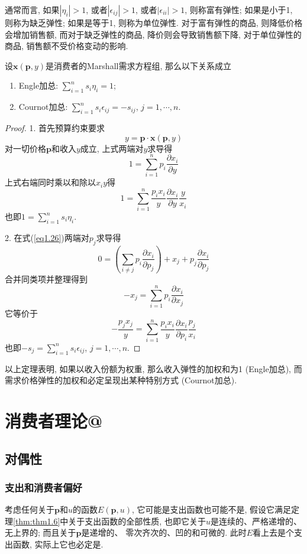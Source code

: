 \documentclass[cn, 12pt, math=mtpro2, bibstyle=apa, blue]{elegantbook}
\makeatletter
\newcommand*{\rom}[1]{\expandafter\@slowromancap\romannumeral #1@}
\newcommand{\p}{\mathbf{p}}
\newcommand{\x}{\mathbf{x}}
\makeatother
\begin{document}
通常而言, 如果$|\eta_i|>1$, 或者$|\epsilon_{ij}|>1$, 或者$|\epsilon_{ii}|>1$, 则称富有弹性; 如果是小于1, 则称为缺乏弹性; 如果是等于1, 则称为单位弹性. 对于富有弹性的商品, 则降低价格会增加销售额, 而对于缺乏弹性的商品, 降价则会导致销售额下降, 对于单位弹性的商品, 销售额不受价格变动的影响.
\begin{theorem}\label{thm:thm1.8}
  设$\x(\p,y)$是消费者的Marshall需求方程组, 那么以下关系成立
  \begin{enumerate}[label=\arabic*.]
    \item Engle加总: $\sum_{i=1}^{n}s_i\eta_i=1$;
    \item Cournot加总: $\sum_{i=1}^{n}s_i\epsilon_{ij}=-s_{ij}$, $j=1,\cdots,n$.
  \end{enumerate}
\end{theorem}
\begin{proof}
  1. 首先预算约束要求
  \begin{equation}\label{eq1.26}
    y=\p\cdot\x(\p,y)
  \end{equation}
  对一切价格$\p$和收入$y$成立, 上式两端对$y$求导得
  $$1=\sum_{i=1}^{n}p_i\frac{\partial x_i}{\partial y}$$
  上式右端同时乘以和除以$x_iy$得
  $$1=\sum_{i=1}^{n}\frac{p_ix_i}{y}\frac{\partial x_i}{\partial y}\frac{y}{x_i}$$
  也即$1=\sum_{i=1}^{n}s_i\eta_i$.

  2. 在式(\ref{eq1.26})两端对$p_j$求导得
  $$0=\left(\sum_{i\ne j}p_i\frac{\partial x_i}{\partial p_j}\right)+x_j+p_j\frac{\partial x_i}{\partial p_j}$$
  合并同类项并整理得到
  $$-x_j=\sum_{i=1}^{n}p_i\frac{\partial x_i}{\partial x_j}$$
  它等价于
  $$-\frac{p_jx_j}{y}=\sum_{i=1}^{n}\frac{p_ix_i}{y}\frac{\partial x_i}{\partial p_i}\frac{p_j}{x_i}$$
  也即$-s_j=\sum_{i=1}^{n}s_i\epsilon_{ij}$, $j=1,\cdots,n$.
\end{proof}
以上定理表明, 如果以收入份额为权重, 那么收入弹性的加权和为1 (Engle加总), 而需求价格弹性的加权和必定呈现出某种特别方式 (Cournot加总).


\chapter{消费者理论\rom{2}}
\section{对偶性}
\subsection{支出和消费者偏好}
考虑任何关于$\p$和$u$的函数$E(\p,u)$, 它可能是支出函数也可能不是, 假设它满足定理\ref{thm:thm1.6}中关于支出函数的全部性质, 也即它关于$u$是连续的、严格递增的、无上界的; 而且关于$\p$是递增的、 零次齐次的、凹的和可微的. 此时$E$看上去是个支出函数, 实际上它也必定是.
\end{document}
